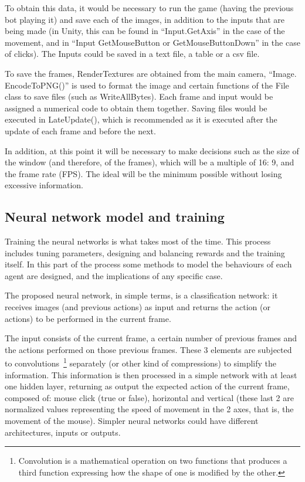 To obtain this data, it would be necessary to run the game (having the previous bot playing it) and save each of the images, in addition to the inputs that are being made (in Unity, this can be found in “Input.GetAxis” in the case of the movement, and in “Input GetMouseButton or GetMouseButtonDown” in the case of clicks). The Inputs could be saved in a text file, a table or a csv file.

To save the frames, RenderTextures are obtained from the main camera, “Image. EncodeToPNG()” is used to format the image and certain functions of the File class to save files (such as WriteAllBytes). Each frame and input would be assigned a numerical code to obtain them together. Saving files would be executed in LateUpdate(), which is recommended as it is executed after the update of each frame and before the next.

In addition, at this point it will be necessary to make decisions such as the size of the window (and therefore, of the frames), which will be a multiple of 16: 9, and the frame rate (FPS). The ideal will be the minimum possible without losing excessive information.


\subsection{Neural network model and training}

Training the neural networks is what takes most of the time. This process includes tuning parameters, designing and balancing rewards and the training itself. In this part of the process some methods to model the behaviours of each agent are designed, and the implications of any specific case.

The proposed neural network, in simple terms, is a classification network: it receives images (and previous actions) as input and returns the action (or actions) to be performed in the current frame.

The input consists of the current frame, a certain number of previous frames and the actions performed on those previous frames. These 3 elements are subjected to convolutions~\footnote{Convolution is a mathematical operation on two functions that produces a third function expressing how the shape of one is modified by the other.} separately (or other kind of compressions) to simplify the information. This information is then processed in a simple network with at least one hidden layer, returning as output the expected action of the current frame, composed of: mouse click (true or false), horizontal and vertical (these last 2 are normalized values representing the speed of movement in the 2 axes, that is, the movement of the mouse). Simpler neural networks could have different architectures, inputs or outputs.

